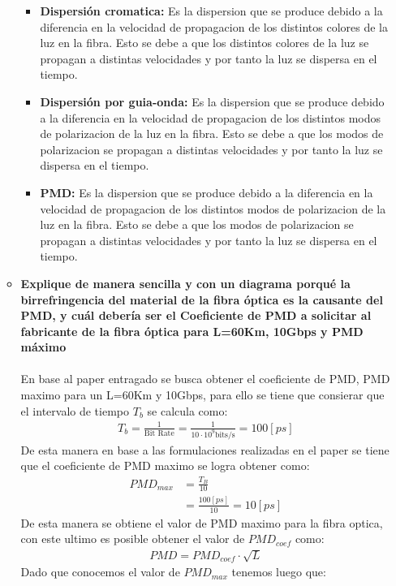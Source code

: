 \begin{enumerate}
\begin{itemize}
\begin{itemize}
		\item \textbf{Dispersión cromatica:} Es la dispersion que se produce debido a la diferencia en la velocidad de propagacion de los distintos colores de la luz en la fibra. Esto se debe a que los distintos colores de la luz se propagan a distintas velocidades y por tanto la luz se dispersa en el tiempo.\\
		\item \textbf{Dispersión por guia-onda:} Es la dispersion que se produce debido a la diferencia en la velocidad de propagacion de los distintos modos de polarizacion de la luz en la fibra. Esto se debe a que los modos de polarizacion se propagan a distintas velocidades y por tanto la luz se dispersa en el tiempo.\\
		\item \textbf{PMD:} Es la dispersion que se produce debido a la diferencia en la velocidad de propagacion de los distintos modos de polarizacion de la luz en la fibra. Esto se debe a que los modos de polarizacion se propagan a distintas velocidades y por tanto la luz se dispersa en el tiempo. 
	\end{itemize}
	\item \textbf{Explique de manera sencilla y con un diagrama porqué la birrefringencia del material de la fibra óptica es la causante del PMD, y cuál debería ser el Coeficiente de PMD a solicitar al fabricante de la fibra óptica para L=60Km, 10Gbps y PMD máximo}\\\\
	En base al paper entragado se busca obtener el coeficiente de PMD, PMD maximo para un L=60Km y 10Gbps, para ello se tiene que consierar que el intervalo de tiempo $T_b$ se calcula como:
	\begin{align}
		T_b = \frac{1}{\text{Bit Rate}} = \frac{1}{10 \cdot 10^{9} \text{bits/s}} = 100[ps]
	\end{align}
	De esta manera en base a las formulaciones realizadas en el paper se tiene que el coeficiente de PMD maximo se logra obtener como:
	\begin{align}
	PMD_{max}&=\frac{T_B}{10}\\
	&= \frac{100[ps]}{10} = 10[ps]
	\end{align}
	De esta manera se obtiene el valor de PMD maximo para la fibra optica, con este ultimo es posible obtener el valor de $PMD_{coef}$ como:
	\begin{align}
		PMD = PMD_{coef} \cdot \sqrt{L}
	\end{align}
	Dado que conocemos el valor de $PMD_{max}$ tenemos luego que:

\end{itemize}
\end{enumerate}
